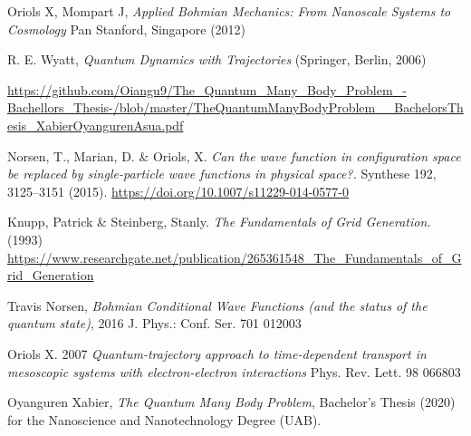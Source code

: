 \documentclass[11pt, a4paper]{article} %
\begin{document}
 


\begin{thebibliography}{1}

	Oriols X, Mompart J, {\em Applied Bohmian Mechanics: From Nanoscale Systems to Cosmology} Pan Stanford, Singapore (2012)
	

R. E. Wyatt, {\em Quantum Dynamics with Trajectories} (Springer, Berlin, 2006)


\href{https://github.com/Oiangu9/The\_Quantum\_Many\_Body\_Problem\_-Bachellors\_Thesis-/blob/master/TheQuantumManyBodyProblem\_\_BachelorsThesis\_XabierOyangurenAsua.pdf}{https://github.com/Oiangu9/The\_Quantum\_Many\_Body\_Problem\_-Bachellors\_Thesis-/blob/master/TheQuantumManyBodyProblem\_\_BachelorsThesis\_XabierOyangurenAsua.pdf}

Norsen, T., Marian, D. \& Oriols, X. {\em Can the wave function in configuration space be replaced by single-particle wave functions in physical space?.} Synthese 192, 3125–3151 (2015). \href{https://doi.org/10.1007/s11229-014-0577-0}{https://doi.org/10.1007/s11229-014-0577-0}


Knupp, Patrick \& Steinberg, Stanly. {\em The Fundamentals of Grid Generation.} (1993) \href{https://www.researchgate.net/publication/265361548_The_Fundamentals_of_Grid_Generation}{https://www.researchgate.net/publication/265361548\_The\_Fundamentals\_of\_Grid\_Generation} 

Travis Norsen, {\em Bohmian Conditional Wave Functions (and the status of the quantum state)}, 2016 J. Phys.: Conf. Ser. 701 012003

	Oriols X. 2007 {\em Quantum-trajectory approach to time-dependent transport in mesoscopic systems with electron-electron interactions} Phys. Rev. Lett. 98 066803
	
	Oyanguren Xabier, {\em The Quantum Many Body Problem}, Bachelor's Thesis (2020) for the Nanoscience and Nanotechnology Degree (UAB).


\end{thebibliography}
\end{document}
